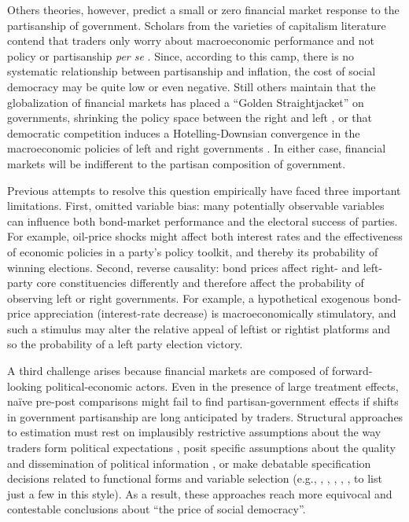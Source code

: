 \documentclass[12pt]{article}
\begin{document}
Others theories, however, predict a small or zero financial market response to the partisanship of government. Scholars from the varieties of capitalism literature contend that traders only worry about macroeconomic performance and not policy or partisanship \textit{per se} \citep{Clark2003, Mosley2000, Garrett1998}. Since, according to this camp, there is no systematic relationship between partisanship and inflation, the cost of social democracy may be quite low or even negative. Still others maintain that the globalization of financial markets has placed a ``Golden Straightjacket'' on governments, shrinking the policy space between the right and left \citep{Rodrik2000}, or that democratic competition induces a Hotelling-Downsian convergence in the macroeconomic policies of left and right governments \citep{Clark2003}. In either case, financial markets will be indifferent to the partisan composition of government.

Previous attempts to resolve this question empirically have faced three important limitations. First, omitted variable bias: many potentially observable variables can influence both bond-market performance and the electoral success of parties. For example, oil-price shocks might affect both interest rates and the effectiveness of economic policies in a party's policy toolkit, and thereby its probability of winning elections. Second, reverse causality: bond prices affect right- and left-party core constituencies differently and therefore affect the probability of observing left or right governments. For example, a hypothetical exogenous bond-price appreciation (interest-rate decrease) is macroeconomically stimulatory, and such a stimulus may alter the relative appeal of leftist or rightist platforms and so the probability of a left party election victory. 

A third challenge arises because financial markets are composed of forward-looking political-economic actors. Even in the presence of large treatment effects, na\"ive pre-post comparisons might fail to find partisan-government effects if shifts in government partisanship are long anticipated by traders. Structural approaches to estimation must rest on implausibly restrictive assumptions about the way traders form political expectations \citep{Alesina1997}, posit specific assumptions about the quality and dissemination of political information \citep{Herron2000}, or make debatable specification decisions related to functional forms and variable selection (e.g., \citet{Garrett1998}, \citet{Franzese2002}, \citet{Clark2003}, \citet{Mosley2003}, \citet{Bernhard2006}, to list just a few in this style). As a result, these approaches reach more equivocal and contestable conclusions about ``the price of social democracy''. 
\end{document}

